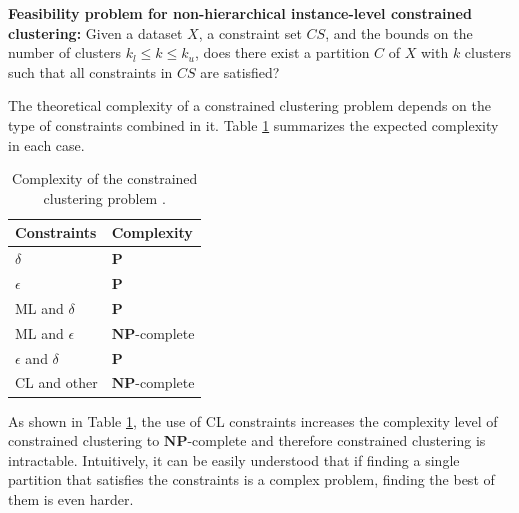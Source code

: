 \begin{definition}
	
	\textbf{Feasibility problem for non-hierarchical instance-level constrained clustering:} Given a dataset $X$, a constraint set $CS$, and the bounds on the number of clusters $k_l \leq k \leq k_u$, does there exist a partition $C$ of $X$ with $k$ clusters such that all constraints in $CS$ are satisfied? \cite{davidson2005clustering,davidson2007survey}
	
	\label{def:FeasibilityProblem}
	
\end{definition}

 The theoretical complexity of a constrained clustering problem depends on the type of constraints combined in it. Table \ref{tab:CCComplexity} summarizes the expected complexity in each case. 

\begin{table}[!h]
	\centering
	\begin{tabular}{ >{\centering\arraybackslash}m{3cm}  >{\centering\arraybackslash}m{3cm} }
		\hline
		\textbf{Constraints} & \textbf{Complexity} \\
		\hline
		$\delta$ & $\mathbf{P}$ \\
		$\epsilon$ & $\mathbf{P}$ \\
		\acs{ML} and $\delta$ & $\mathbf{P}$ \\
		\acs{ML} and $\epsilon$ & $\mathbf{NP}$-complete \\
		$\epsilon$ and $\delta$ & $\mathbf{P}$ \\
		\acs{CL} and other & $\mathbf{NP}$-complete \\
		\hline
		
	\end{tabular}%
	\caption[Complexity of the constrained clustering problem.]{Complexity of the constrained clustering problem \cite{davidson2007survey}.}
\label{tab:CCComplexity}
\end{table}

As shown in Table \ref{tab:CCComplexity}, the use of \acs{CL} constraints increases the complexity level of constrained clustering to $\mathbf{NP}$-complete and therefore constrained clustering is intractable. Intuitively, it can be easily understood that if finding a single partition that satisfies the constraints is a complex problem, finding the best of them is even harder.

